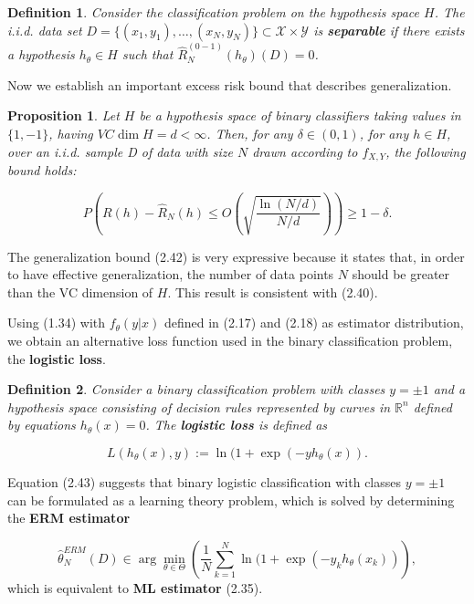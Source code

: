 \documentclass{report}
\newtheorem{definition}{Definition}[chapter]
\newtheorem{proposition}{Proposition}[chapter]
\begin{document}
\begin{definition}
Consider the classification problem on the hypothesis space $H$. The i.i.d. data set $D = \{(x_1,y_1), \dots, (x_N,y_N)\} \subset \mathcal{X} \times \mathcal{Y}$ is \textbf{separable} if there exists a hypothesis $h_\theta \in H$ such that $\hat{R}^{(0-1)}_N(h_\theta)(D) = 0$.
\end{definition}
Now we establish an important excess risk bound that describes generalization.

\begin{proposition}
Let $H$ be a hypothesis space of binary classifiers taking values in $\{1, -1\}$, having $VC\dim H = d < \infty$. Then, for any $\delta \in (0,1)$, for any $h \in H$, over an i.i.d. sample D of data with size $N$ drawn according to $f_{X,Y}$, the following bound holds:

\begin{equation}
P\left(R(h) - \hat{R}_N(h) \leq O\left(\sqrt{\frac{\ln(N/d)}{N/d}}\right)\right) \geq 1-\delta.
\end{equation}
\end{proposition}
The generalization bound (2.42) is very expressive because it states that, in order to have effective generalization, the number of data points $N$ should be greater than the VC dimension of $H$. This result is consistent with (2.40).

Using (1.34) with $f_\theta(y|x)$ defined in (2.17) and (2.18) as estimator distribution, we obtain an alternative loss function used in the binary classification problem, the \textbf{logistic loss}.

\begin{definition}
Consider a binary classification problem with classes $y=\pm 1$ and a hypothesis space consisting of decision rules represented by curves in $\mathbb{R}^n$ defined by equations $h_\theta(x) = 0$. The \textbf{logistic loss} is defined as

\begin{equation}
L(h_\theta(x), y) := \ln(1+\exp(-yh_\theta(x)).
\end{equation}
\end{definition}
Equation (2.43) suggests that binary logistic classification with classes $y=\pm 1$ can be formulated as a learning theory problem, which is solved by determining the \textbf{ERM estimator}

\begin{equation}
\hat{\theta}_N^{ERM}(D) \in \arg \min_{\theta \in \Theta}\left(\frac{1}{N}\sum_{k=1}^N \ln(1+\exp(-y_kh_\theta(x_k))\right),
\end{equation}
which is equivalent to \textbf{ML estimator} (2.35).
\end{document}
